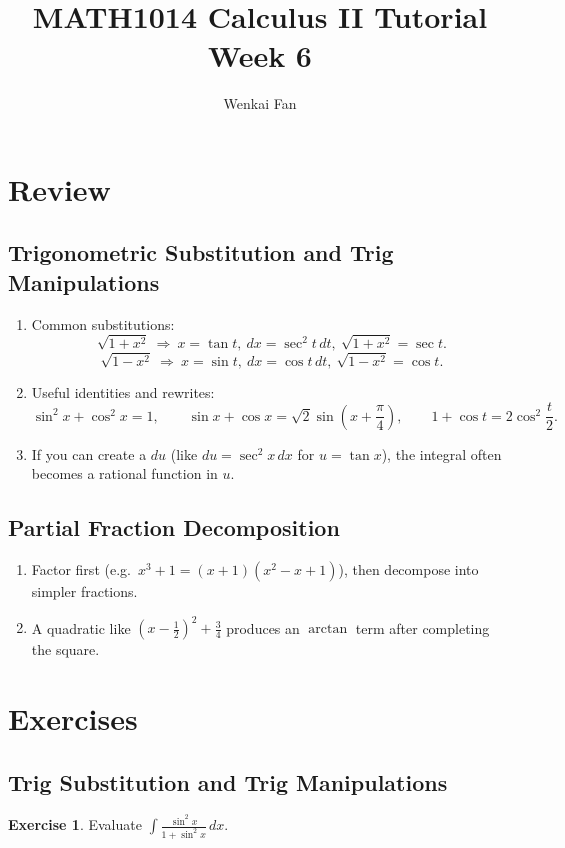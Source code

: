 \documentclass[11pt]{article}
\title{\vspace{-1.0em}MATH1014 Calculus II Tutorial\\Week 6}
\author{Wenkai Fan}
\date{}
\theoremstyle{definition}
\newtheorem{exercise}{Exercise}[section]
\begin{document}
\maketitle
\thispagestyle{fancy}

\section{Review}

\subsection{Trigonometric Substitution and Trig Manipulations}
\begin{enumerate}
  \item Common substitutions:
  \[
  \sqrt{1+x^2}\ \Rightarrow\ x=\tan t,\ dx=\sec^2 t\,dt,\ \sqrt{1+x^2}=\sec t.
  \]
  \[
  \sqrt{1-x^2}\ \Rightarrow\ x=\sin t,\ dx=\cos t\,dt,\ \sqrt{1-x^2}=\cos t.
  \]
  \item Useful identities and rewrites:
  \[
  \sin^2 x+\cos^2 x=1,
  \qquad
  \sin x+\cos x=\sqrt{2}\sin\!\left(x+\frac{\pi}{4}\right),
  \qquad
  1+\cos t=2\cos^2\frac{t}{2}.
  \]
  \item If you can create a $du$ (like $du=\sec^2 x\,dx$ for $u=\tan x$), the integral often becomes a rational function in $u$.
\end{enumerate}

\subsection{Partial Fraction Decomposition}
\begin{enumerate}
  \item Factor first (e.g.\ $x^3+1=(x+1)(x^2-x+1)$), then decompose into simpler fractions.
  \item A quadratic like $(x-\tfrac12)^2+\tfrac34$ produces an $\arctan$ term after completing the square.
\end{enumerate}

\section{Exercises}

\subsection{Trig Substitution and Trig Manipulations}

\begin{exercise}
Evaluate $\displaystyle \int \frac{\sin^2 x}{1+\sin^2 x}\,dx$.
\end{exercise}
\end{document}
